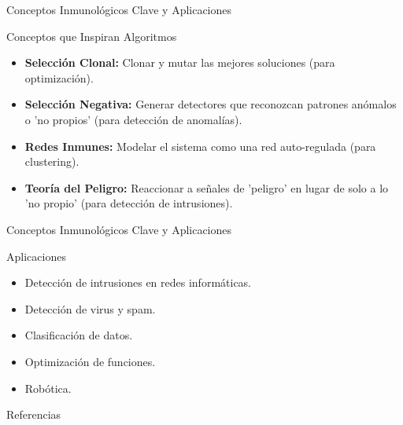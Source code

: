 \documentclass[aspectratio=169,xcolor=dvipsnames]{beamer}
\begin{document}
\begin{frame}{Conceptos Inmunológicos Clave y Aplicaciones}
  
            \begin{block}{Conceptos que Inspiran Algoritmos}
                \begin{itemize}
                    \item \textbf{Selección Clonal:} Clonar y mutar las mejores soluciones (para optimización).
                    \item \textbf{Selección Negativa:} Generar detectores que reconozcan patrones anómalos o 'no propios' (para detección de anomalías).
                    \item \textbf{Redes Inmunes:} Modelar el sistema como una red auto-regulada (para clustering).
                    \item \textbf{Teoría del Peligro:} Reaccionar a señales de 'peligro' en lugar de solo a lo 'no propio' (para detección de intrusiones).
                \end{itemize}
            \end{block}

           
\end{frame}
\begin{frame}{Conceptos Inmunológicos Clave y Aplicaciones}

 \begin{alertblock}{Aplicaciones}
                 \begin{itemize}
                    \item Detección de intrusiones en redes informáticas.
                    \item Detección de virus y spam.
                    \item Clasificación de datos.
                    \item Optimización de funciones.
                    \item Robótica.
                \end{itemize}
            \end{alertblock}
\end{frame}

\begin{frame}[allowframebreaks]{Referencias}
    \nocite{*} %
    
\end{frame}
\end{document}
